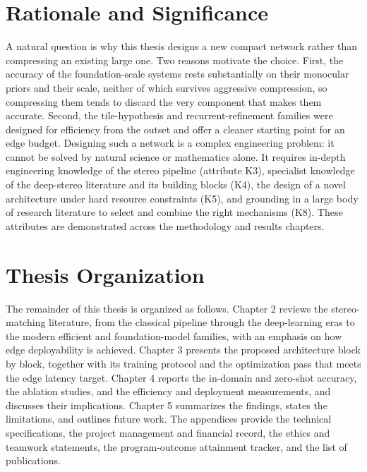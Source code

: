 \section{Rationale and Significance}
A natural question is why this thesis designs a new compact network rather
than compressing an existing large one. Two reasons motivate the choice.
First, the accuracy of the foundation-scale systems rests substantially on
their monocular priors and their scale, neither of which survives
aggressive compression, so compressing them tends to discard the very
component that makes them accurate. Second, the tile-hypothesis and
recurrent-refinement families were designed for efficiency from the
outset and offer a cleaner starting point for an edge budget. Designing
such a network is a complex engineering problem: it cannot be solved by
natural science or mathematics alone. It requires in-depth engineering
knowledge of the stereo pipeline (attribute K3), specialist knowledge of
the deep-stereo literature and its building blocks (K4), the design of a
novel architecture under hard resource constraints (K5), and grounding in
a large body of research literature to select and combine the right
mechanisms (K8). These attributes are demonstrated across the methodology
and results chapters.

\section{Thesis Organization}
The remainder of this thesis is organized as follows. Chapter 2 reviews
the stereo-matching literature, from the classical pipeline through the
deep-learning eras to the modern efficient and foundation-model families,
with an emphasis on how edge deployability is achieved. Chapter 3 presents
the proposed architecture block by block, together with its training
protocol and the optimization pass that meets the edge latency target.
Chapter 4 reports the in-domain and zero-shot accuracy, the ablation
studies, and the efficiency and deployment measurements, and discusses
their implications. Chapter 5 summarizes the findings, states the
limitations, and outlines future work. The appendices provide the
technical specifications, the project management and financial record, the
ethics and teamwork statements, the program-outcome attainment tracker,
and the list of publications.
